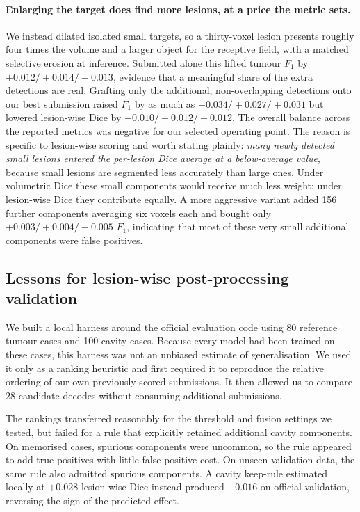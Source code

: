 \documentclass[runningheads]{llncs}
\begin{document}
\paragraph{Enlarging the target does find more lesions, at a price the metric sets.} We instead dilated isolated
small targets, so a thirty-voxel lesion presents roughly four times the volume and a larger
object for the receptive field, with a matched selective erosion at inference. Submitted alone
this lifted tumour $F_1$ by $+0.012/+0.014/+0.013$, evidence that a meaningful share of the extra
detections are real. Grafting only the additional, non-overlapping detections onto our best
submission raised $F_1$ by as much as $+0.034/+0.027/+0.031$ but lowered lesion-wise Dice by
$-0.010/-0.012/-0.012$. The overall balance across the reported metrics was negative for our selected operating point. The reason is specific to lesion-wise scoring and
worth stating plainly: \emph{many newly detected small lesions entered the per-lesion Dice average at a below-average value}, because small lesions are segmented less accurately than large ones.
Under volumetric Dice these small components would receive much less weight; under lesion-wise
Dice they contribute equally. A more
aggressive variant added 156 further components averaging six voxels each and bought only
$+0.003/+0.004/+0.005$ $F_1$, indicating that most of these very small additional components were false positives.

\subsection{Lessons for lesion-wise post-processing validation}
\label{sec:harness}

We built a local harness around the official evaluation code using 80 reference tumour cases and
100 cavity cases. Because every model had been trained on these cases, this harness was not an
unbiased estimate of generalisation. We used it only as a ranking heuristic and first required it
to reproduce the relative ordering of our own previously scored submissions. It then allowed us
to compare 28 candidate decodes without consuming additional submissions.

The rankings transferred reasonably for the threshold and fusion settings we tested, but failed
for a rule that explicitly retained additional cavity components. On memorised cases, spurious
components were uncommon, so the rule appeared to add true positives with little false-positive
cost. On unseen validation data, the same rule also admitted spurious components. A cavity
keep-rule estimated locally at $+0.028$ lesion-wise Dice instead produced $-0.016$ on official
validation, reversing the sign of the predicted effect.
\end{document}
